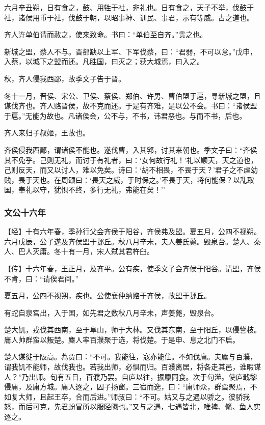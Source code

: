 \documentclass[]{article}
\begin{document}
六月辛丑朔，日有食之，鼓、用牲于社，非礼也。日有食之，天子不举，伐鼓于社，诸侯用币于社，伐鼓于朝，以昭事神、训民、事君，示有等威。古之道也。

齐人许单伯请而赦之，使来致命。书曰：``单伯至自齐。''贵之也。

新城之盟，蔡人不与。晋郤缺以上军、下军伐蔡，曰：``君弱，不可以怠。''戊申，入蔡，以城下之盟而还。凡胜国，曰灭之；获大城焉，曰入之。

秋，齐人侵我西鄙，故季文子告于晋。

冬十一月，晋侯、宋公、卫侯、蔡侯、郑伯、许男、曹伯盟于扈，寻新城之盟，且谋伐齐也。齐人赂晋侯，故不克而还。于是有齐难，是以公不会。书曰：``诸侯盟于扈。''无能为故也。凡诸侯会，公不与，不书，讳君恶也。与而不书，后也。

齐人来归子叔姬，王故也。

齐侯侵我西鄙，谓诸侯不能也。遂伐曹，入其郛，讨其来朝也。季文子曰：``齐侯其不免乎。己则无礼，而讨于有礼者，曰：`女何故行礼！'礼以顺天，天之道也，己则反天，而又以讨人，难以免矣。诗曰：`胡不相畏，不畏于天？'君子之不虐幼贱，畏于天也。在周颂曰：`畏天之威，于时保之。'不畏于天，将何能保？以乱取国，奉礼以守，犹惧不终，多行无礼，弗能在矣！''

\hypertarget{header-n1246}{%
\subsubsection{文公十六年}\label{header-n1246}}

【经】十有六年春，季孙行父会齐侯于阳谷，齐侯弗及盟。夏五月，公四不视朔。六月戊辰，公子遂及齐侯盟于郪丘。秋八月辛未，夫人姜氏薨。毁泉台。楚人、秦人、巴人灭庸。冬十有一月，宋人弑其君杵臼。

【传】十六年春，王正月，及齐平。公有疾，使季文子会齐侯于阳谷。请盟，齐侯不肯，曰：``请俟君间。''

夏五月，公四不视朔，疾也。公使襄仲纳赂于齐侯，故盟于郪丘。

有蛇自泉宫出，入于国，如先君之数秋八月辛未，声姜薨，毁泉台。

楚大饥，戎伐其西南，至于阜山，师于大林。又伐其东南，至于阳丘，以侵訾枝。庸人帅群蛮以叛楚。麇人率百濮聚于选，将伐楚。于是申、息之北门不启。

楚人谋徙于阪高。蒍贾曰：``不可。我能往，寇亦能住。不如伐庸。夫麇与百濮，谓我饥不能师，故伐我也。若我出师，必惧而归。百濮离居，将各走其邑，谁暇谋人？''乃出师。旬有五日，百濮乃罢。自庐以往，振廪同食。次于句澨。使庐戢黎侵庸，及庸方城。庸人逐之，囚子扬窗。三宿而逸，曰：``庸师众，群蛮聚焉，不如复大师，且起王卒，合而后进。''师叔曰：``不可。姑又与之遇以骄之。彼骄我怒，而后可克，先君蚡冒所以服陉隰也。''又与之遇，七遇皆北，唯裨、鯈、鱼人实逐之。
\end{document}

